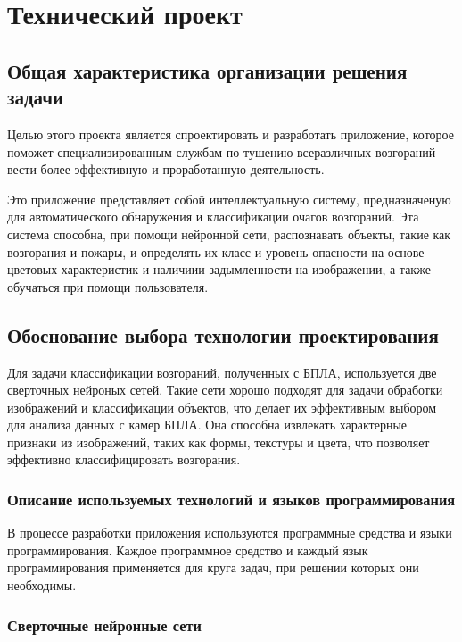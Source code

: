 \section{Технический проект}
\subsection{Общая характеристика организации решения задачи}

Целью этого проекта является спроектировать и разработать приложение, которое поможет специализированным службам по тушению всеразличных возгораний вести более эффективную и проработанную деятельность.

Это приложение представляет собой интеллектуальную систему, предназначеную для автоматического обнаружения и классификации очагов возгораний. Эта система способна, при помощи нейронной сети, распознавать объекты, такие как возгорания и пожары, и определять их класс и уровень опасности на основе цветовых характеристик и наличиии задымленности на изображении, а также обучаться при помощи пользователя.

\subsection{Обоснование выбора технологии проектирования}

Для задачи классификации возгораний, полученных с БПЛА, используется две сверточных нейроных сетей. Такие сети хорошо подходят для задачи обработки изображений и классификации объектов, что делает их эффективным выбором для анализа данных с камер БПЛА. Она способна извлекать характерные признаки из изображений, таких как формы, текстуры и цвета, что позволяет эффективно классифицировать возгорания.

\subsubsection{Описание используемых технологий и языков программирования}

В процессе разработки приложения используются программные средства и языки программирования. Каждое программное средство и каждый язык программирования применяется для круга задач, при решении которых они необходимы.

\subsubsection{Сверточные нейронные сети}

